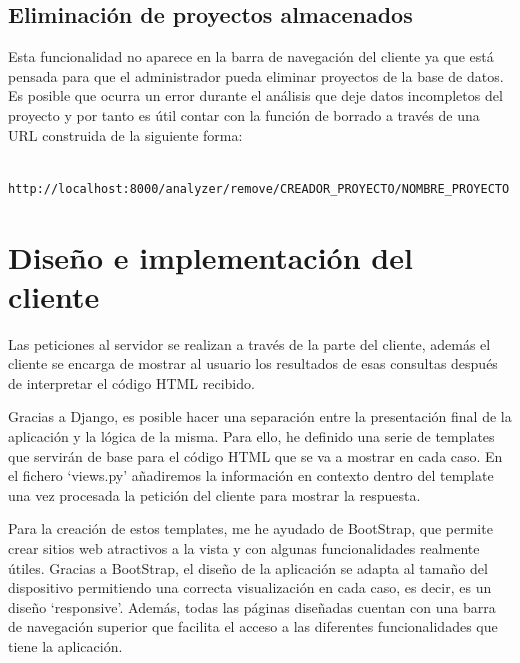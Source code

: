 \documentclass[a4paper, 12pt]{book}
\begin{document}
\subsection{Eliminación de proyectos almacenados}
\label{sec:seccion12.5}
Esta funcionalidad no aparece en la barra de navegación del cliente ya que está pensada para que el administrador pueda eliminar proyectos de la base de datos. Es posible que ocurra un error durante el análisis que deje datos incompletos del proyecto y por tanto es útil contar con la función de borrado a través de una URL construida de la siguiente forma:

{\footnotesize
\begin{verbatim}
    http://localhost:8000/analyzer/remove/CREADOR_PROYECTO/NOMBRE_PROYECTO
\end{verbatim}
}

\section{Diseño e implementación del cliente} 
\label{sec:seccion13}
Las peticiones al servidor se realizan a través de la parte del cliente, además el cliente se encarga de mostrar al usuario los resultados de esas consultas después de interpretar el código HTML recibido.

Gracias a Django, es posible hacer una separación entre la presentación final de la aplicación y la lógica de la misma. Para ello, he definido una serie de templates que servirán de base para el código HTML que se va a mostrar en cada caso. En el fichero `views.py' añadiremos la información en contexto dentro del template una vez procesada la petición del cliente para mostrar la respuesta.

Para la creación de estos templates, me he ayudado de BootStrap, que permite crear sitios web atractivos a la vista y con algunas funcionalidades realmente útiles. Gracias a BootStrap, el diseño de la aplicación se adapta al tamaño del dispositivo permitiendo una correcta visualización en cada caso, es decir, es un diseño `responsive'. Además, todas las páginas diseñadas cuentan con una barra de navegación superior que facilita el acceso a las diferentes funcionalidades que tiene la aplicación.
\end{document}
